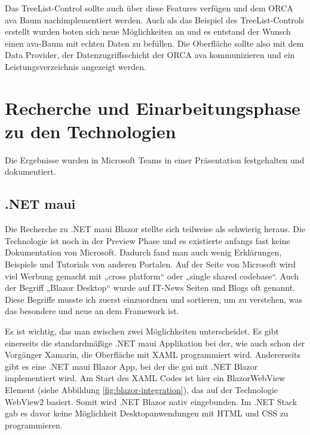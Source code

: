 Das TreeList-Control sollte auch über diese Features verfügen und dem ORCA \ac{ava} Baum nachimplementiert werden. 
Auch als das Beispiel des TreeList-Controls erstellt wurden boten sich neue Möglichkeiten an und es entstand der Wunsch einen \ac{ava}-Baum mit echten Daten zu befüllen. Die Oberfläche sollte also mit dem Data Provider, der Datenzugriffsschicht der ORCA \ac{ava} kommunizieren und ein Leistungsverzeichnis angezeigt werden.

\section{Recherche und Einarbeitungsphase zu den Technologien}

Die Ergebnisse wurden in Microsoft Teams in einer Präsentation festgehalten und dokumentiert.

\subsection{.NET \ac{maui}}
Die Recherche zu .NET \ac{maui} Blazor stellte sich teilweise als schwierig heraus. Die Technologie ist noch in der Preview Phase und es existierte anfangs fast keine Dokumentation von Microsoft. Dadurch fand man auch wenig Erklärungen, Beispiele und Tutorials von anderen Portalen. Auf der Seite von Microsoft wird viel Werbung gemacht mit „cross platform“ oder „single shared codebase“. Auch der Begriff „Blazor Desktop“ wurde auf IT-News Seiten und Blogs oft genannt. Diese Begriffe musste ich zuerst einzuordnen und sortieren, um zu verstehen, was das besondere und neue an dem Framework ist.

Es ist wichtig, das man zwischen zwei Möglichkeiten unterscheidet. Es gibt einerseits die standardmäßige .NET \ac{maui} Applikation bei der, wie auch schon der Vorgänger Xamarin, die Oberfläche mit XAML programmiert wird. Andererseits gibt es eine .NET \ac{maui} Blazor App, bei der die \ac{gui} mit .NET Blazor implementiert wird. Am Start des XAML Codes ist hier ein BlazorWebView Element (siehe Abbildung \ref{fig:blazor-integration}), das auf der Technologie WebView2 basiert. Somit wird .NET Blazor nativ eingebunden. Im .NET Stack gab es davor keine Möglichkeit Desktopanwendungen mit HTML und CSS zu programmieren. \cite{Davidbritch_22}



